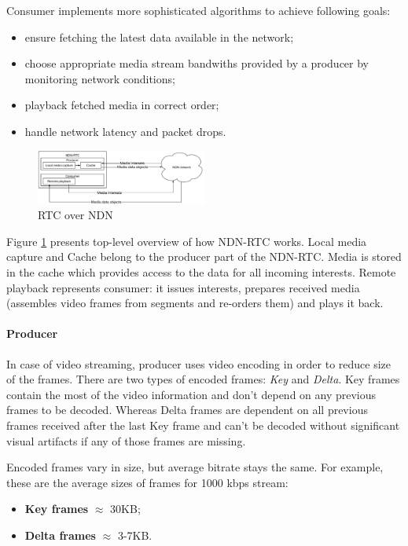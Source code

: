 \documentclass[10pt]{icn/sig-alternate-10pt} %
\newcommand{\ndnrtcName}{NDN-RTC} %
\begin{document}
Consumer implements more sophisticated algorithms to achieve following goals:
\begin{itemize}
\item ensure fetching the latest data available in the network; 
\item choose appropriate media stream bandwiths provided by a producer by monitoring network conditions;
\item playback fetched media in correct order;
\item handle network latency and packet drops.
\end{itemize}

\begin{figure}[t!]
\centering
\includegraphics[width=0.5\textwidth]{architecture}
\caption{RTC over NDN}
\label{fig:arc}
\end{figure}

Figure \ref{fig:arc} presents top-level overview of how \ndnrtcName{} works. Local media capture and Cache belong to the producer part of the \ndnrtcName{}. Media is stored in the cache which provides access to the data for all incoming interests. Remote playback represents consumer: it issues interests, prepares received media (assembles video frames from segments and re-orders them) and plays it back.

\paragraph{Producer}

In case of video streaming, producer uses video encoding in order to reduce size of the frames. There are two types of encoded frames: \textit{Key} and \textit{Delta}. Key frames contain the most of the video information and don't depend on any previous frames to be decoded. Whereas Delta frames are dependent on all previous frames received after the last Key frame and can't be decoded without significant visual artifacts if any of those frames are missing.

Encoded frames vary in size, but average bitrate stays the same. For example, these are the average sizes of frames for 1000 kbps stream:
\begin{itemize}
\item \textbf{Key frames} $\approx$ 30KB;
\item \textbf{Delta frames} $\approx$ 3-7KB.
\end{itemize}
\end{document}
